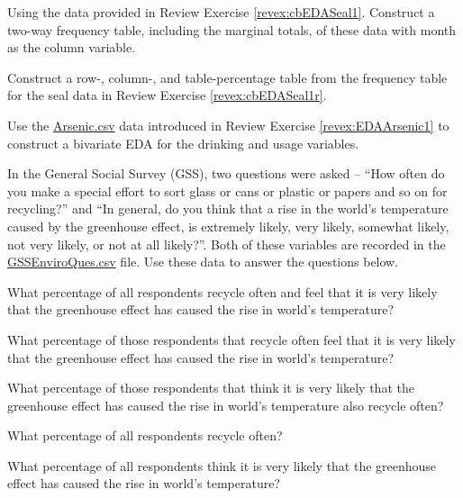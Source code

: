 \documentclass[10pt,openany]{book}\usepackage[]{graphicx}\usepackage[]{color}
\begin{document}

\newpage
\begin{exsection}
  \item \label{revex:cbEDASeal1r} \rhw{} Using the data provided in Review Exercise \ref{revex:cbEDASeal1}.  Construct a two-way frequency table, including the marginal totals, of these data with month as the column variable. 

  \item \label{revex:cbEDASeal2r} Construct a row-, column-, and table-percentage table from the frequency table for the seal data in Review Exercise \ref{revex:cbEDASeal1r}. 

  \item \label{revex:cbEDAArsenic4} Use the \href{https://raw.githubusercontent.com/droglenc/NCData/master/Arsenic.csv}{Arsenic.csv} data introduced in Review Exercise \ref{revex:EDAArsenic1} to construct a bivariate EDA for the drinking and usage variables. 

\begin{minipage}{\textwidth}
  \item \label{revex:cbEDAGSS2}  In the General Social Survey (GSS), two questions were asked -- ``How often do you make a special effort to sort glass or cans or plastic or papers and so on for recycling?'' and ``In general, do you think that a rise in the world's temperature caused by the greenhouse effect, is extremely likely, very likely, somewhat likely, not very likely, or not at all likely?''.  Both of these variables are recorded in the \href{https://raw.githubusercontent.com/droglenc/NCData/master/GSSEnviroQues.csv}{GSSEnviroQues.csv} file.  Use these data to answer the questions below. 
  \begin{Enumerate}
    \item What percentage of all respondents recycle often and feel that it is very likely that the greenhouse effect has caused the rise in world's temperature?
    \item What percentage of those respondents that recycle often feel that it is very likely that the greenhouse effect has caused the rise in world's temperature?
    \item What percentage of those respondents that think it is very likely that the greenhouse effect has caused the rise in world's temperature also recycle often?
    \item What percentage of all respondents recycle often?
    \item What percentage of all respondents think it is very likely that the greenhouse effect has caused the rise in world's temperature?
  \end{Enumerate}
\end{minipage}


\end{exsection}
\end{document}
